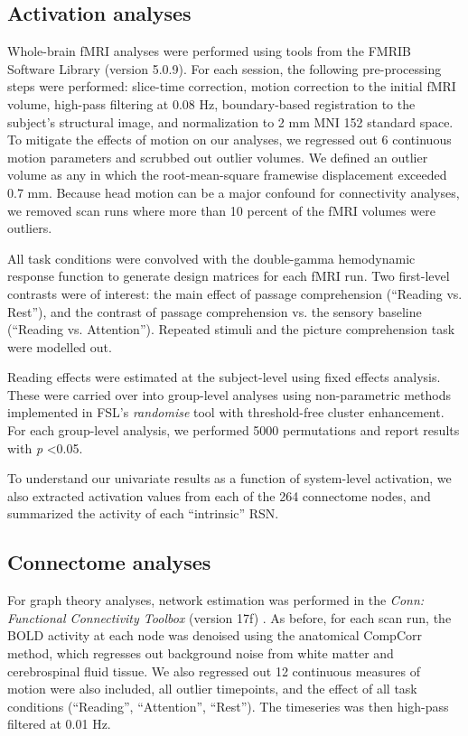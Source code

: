 \subsection{Activation analyses}

Whole-brain fMRI analyses were performed using tools from the FMRIB Software Library (version 5.0.9). For each session, the following pre-processing steps were performed:  slice-time correction, motion correction to the initial fMRI volume, high-pass filtering at 0.08 Hz, boundary-based registration to the subject's structural image, and normalization to 2 mm MNI 152 standard space. To mitigate the effects of motion on our analyses, we regressed out 6 continuous motion parameters and scrubbed out outlier volumes. We defined an outlier volume as any in which the root-mean-square framewise displacement exceeded 0.7 mm. Because head motion can be a major confound for connectivity analyses, we removed scan runs where more than 10 percent of the fMRI volumes were outliers.

All task conditions were convolved with the double-gamma hemodynamic response function to generate design matrices for each fMRI run. Two first-level contrasts were of interest: the main effect of passage comprehension (``Reading vs. Rest''), and the contrast of passage comprehension vs. the sensory baseline (``Reading vs. Attention''). Repeated stimuli and the picture comprehension task were modelled out.

Reading effects were estimated at the subject-level using fixed effects analysis. These were carried over into group-level analyses using non-parametric methods implemented in FSL’s \textit{randomise} tool with threshold-free cluster enhancement. For each group-level analysis, we performed 5000 permutations and report results with \textit{p} \textless 0.05. 

To understand our univariate results as a function of system-level activation, we also extracted activation values from each of the 264 connectome nodes, and summarized the activity of each ``intrinsic'' RSN.

\subsection{Connectome analyses}

For graph theory analyses, network estimation was performed in the \textit{Conn: Functional Connectivity Toolbox} (version 17f) \citep{WhitfieldGabrieli2012}. As before, for each scan run, the BOLD activity at each node was denoised using the anatomical CompCorr method, which regresses out background noise from white matter and cerebrospinal fluid tissue. We also regressed out 12 continuous measures of motion were also included, all outlier timepoints, and the effect of all task conditions (``Reading'', ``Attention'', ``Rest''). The timeseries was then high-pass filtered at 0.01 Hz.

